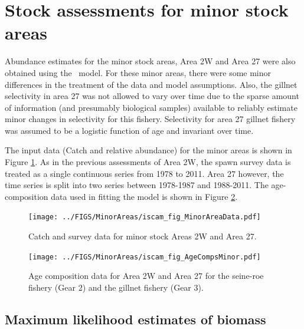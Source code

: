 
\section{Stock assessments for minor stock areas}

Abundance estimates for the minor stock areas, Area 2W and Area 27 were also obtained using the \iscam\ model.  For these minor areas, there were some minor differences in the treatment of the data and model assumptions.  Also, the gillnet selectivity in area 27 was not allowed to vary over time due to the sparse amount of information (and presumably biological samples) available to reliably estimate minor changes in selectivity for this fishery. Selectivity for area 27 gillnet fishery was assumed to be a logistic function of age and invariant over time.

The input data (Catch and relative abundance) for the minor areas is shown in Figure \ref{Results:Minor:figData}.  As in the previous assessments of Area 2W, the spawn survey data is treated as a single continuous series from 1978 to 2011.  Area 27 however, the time series is split into two series between 1978-1987 and 1988-2011.  The age-composition data used in fitting the model is shown in Figure \ref{Results:Minor:figAgeComps}.




\begin{figure}[!tbp]
	\texttt{[image: ../FIGS/MinorAreas/iscam\_fig\_MinorAreaData.pdf]}\\
	\caption{Catch and survey data for minor stock Areas 2W and Area 27.}\label{Results:Minor:figData}
\end{figure}

\begin{figure}[!tbp]
	\texttt{[image: ../FIGS/MinorAreas/iscam\_fig\_AgeCompsMinor.pdf]}\\
	\caption{Age composition data for Area 2W and Area 27 for the seine-roe fishery (Gear 2) and the gillnet fishery (Gear 3).}\label{Results:Minor:figAgeComps}
\end{figure}


\subsection{Maximum likelihood estimates of biomass}

